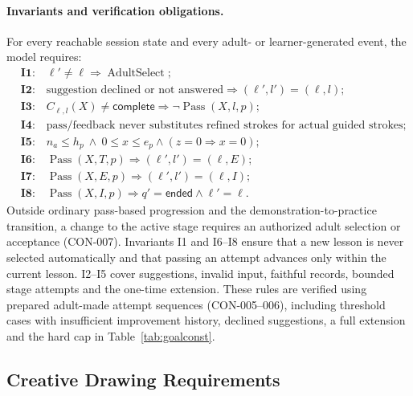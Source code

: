 \documentclass[12pt]{article}
\renewcommand{\_}{\textunderscore\allowbreak}%
\begin{document}
\paragraph{Invariants and verification obligations.}
For every reachable session state and every adult- or learner-generated event,
the model requires:
\[
\begin{aligned}
&\textbf{I1:}\quad \ell'\ne\ell
  \Longrightarrow\operatorname{AdultSelect};\\
&\textbf{I2:}\quad \text{suggestion declined or not answered}
  \Longrightarrow (\ell',l')=(\ell,l);\\
&\textbf{I3:}\quad C_{\ell,l}(X)\ne\textsf{complete}
  \Longrightarrow \neg\operatorname{Pass}(X,l,p);\\
&\textbf{I4:}\quad \text{pass/feedback never substitutes refined strokes
   for actual guided strokes};\\
&\textbf{I5:}\quad n_a\le h_p\ \land\ 0\le x\le e_p
   \land (z=0\Rightarrow x=0);\\
&\textbf{I6:}\quad \operatorname{Pass}(X,T,p)
  \Longrightarrow (\ell',l')=(\ell,E);\\
&\textbf{I7:}\quad \operatorname{Pass}(X,E,p)
  \Longrightarrow (\ell',l')=(\ell,I);\\
&\textbf{I8:}\quad \operatorname{Pass}(X,I,p)
  \Longrightarrow q'=\textsf{ended}\land\ell'=\ell.
\end{aligned}
\]
Outside ordinary pass-based progression and the demonstration-to-practice
transition, a change to the active stage requires an authorized adult selection
or acceptance (CON-007). Invariants I1 and I6--I8 ensure that a new lesson is
never selected automatically and that passing an attempt advances only within
the current lesson. I2--I5 cover suggestions, invalid input, faithful records,
bounded stage attempts and the one-time extension. These rules are verified
using prepared adult-made attempt sequences (CON-005--006), including threshold
cases with insufficient improvement history, declined suggestions, a full
extension and the hard cap in Table~\ref{tab:goalconst}.

\subsection{Creative Drawing Requirements}
\label{sec:fr-creative}
\end{document}
